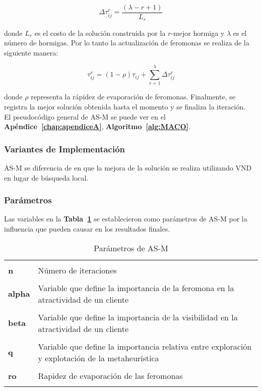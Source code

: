 \begin{equation}
\Delta\tau_{ij}^r = \frac{(\lambda - r + 1)}{L_r}
\end{equation}

donde $L_r$ es el costo de la solución construida por la $r$-mejor hormiga y $\lambda$ es el número de hormigas. Por lo tanto la actualización de feromonas se realiza de la siguiente manera:

\begin{equation}
\tau_{ij}^r = (1 - \rho)\tau_{ij} + \sum_{r=1}^{\lambda}\Delta\tau_{ij}^r
\end{equation}

donde $\rho$ representa la rápidez de evaporación de feromonas. Finalmente, se registra la mejor solución obtenida hasta el momento y se finaliza la iteración.\\

El pseudocódigo general de AS-M se puede ver en el \textbf{Apéndice~\ref{chap:apendiceA}}, \textbf{Algoritmo~\ref{alg:MACO}}.

\subsubsection*{Variantes de Implementación}

AS-M se diferencia de \cite{maco} en que la mejora de la solución se realiza utilizando VND en lugar de búsqueda local.

\subsubsection*{Parámetros}

Las variables en la \textbf{Tabla~\ref{table:param-aco}} se establecieron como parámetros de AS-M por la influencia que pueden causar en los resultados finales.

\begin{table}[ht]
\centering
\small
\caption{Parámetros de AS-M}
\begin{tabular}{l||p{15cm}}
\hline\hline\\
\textbf{n} & Número de iteraciones\\ [0.7ex]\cline{2-2}\\
\textbf{alpha} & Variable que define la importancia de la feromona en la atractividad de un cliente\\ [0.7ex]\cline{2-2}\\
\textbf{beta} & Variable que define la importancia de la visibilidad en la atractividad de un cliente\\ [0.7ex]\cline{2-2}\\
\textbf{q} & Variable que define la importancia relativa entre exploración y explotación de la metaheurística \\ [0.7ex]\cline{2-2}\\
\textbf{ro} & Rapidez de evaporación de las feromonas\\
\\ \hline\hline
\end{tabular}
\label{table:param-aco}
\end{table}



